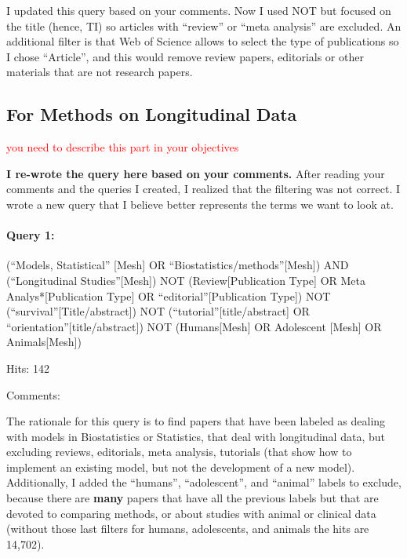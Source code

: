 \documentclass[
]{article}
\let\oldparagraph\paragraph
\renewcommand{\paragraph}[1]{\oldparagraph{#1}\mbox{}}
\newcommand{\BN}[1]{\textcolor{red}{#1}}
\begin{document}
I updated this query based on your comments. Now I used NOT but focused
on the title (hence, TI) so articles with ``review'' or ``meta
analysis'' are excluded. An additional filter is that Web of Science
allows to select the type of publications so I chose ``Article'', and
this would remove review papers, editorials or other materials that are
not research papers.

\hypertarget{for-methods-on-longitudinal-data}{%
\subsection{For Methods on Longitudinal
Data}\label{for-methods-on-longitudinal-data}}

\BN{you need to describe this part in your objectives}

\textbf{I re-wrote the query here based on your comments.} After reading
your comments and the queries I created, I realized that the filtering
was not correct. I wrote a new query that I believe better represents
the terms we want to look at.

\hypertarget{query-1-1}{%
\paragraph{Query 1:}\label{query-1-1}}

(``Models, Statistical'' {[}Mesh{]} OR
``Biostatistics/methods''{[}Mesh{]}) AND (``Longitudinal
Studies''{[}Mesh{]}) NOT (Review{[}Publication Type{]} OR Meta
Analys*{[}Publication Type{]} OR ``editorial''{[}Publication Type{]})
NOT (``survival''{[}Title/abstract{]}) NOT
(``tutorial''{[}title/abstract{]} OR
``orientation''{[}title/abstract{]}) NOT (Humans{[}Mesh{]} OR Adolescent
{[}Mesh{]} OR Animals{[}Mesh{]})

Hits: 142

Comments:

The rationale for this query is to find papers that have been labeled as
dealing with models in Biostatistics or Statistics, that deal with
longitudinal data, but excluding reviews, editorials, meta analysis,
tutorials (that show how to implement an existing model, but not the
development of a new model). Additionally, I added the ``humans'',
``adolescent'', and ``animal'' labels to exclude, because there are
\textbf{many} papers that have all the previous labels but that are
devoted to comparing methods, or about studies with animal or clinical
data (without those last filters for humans, adolescents, and animals
the hits are 14,702).
\end{document}
